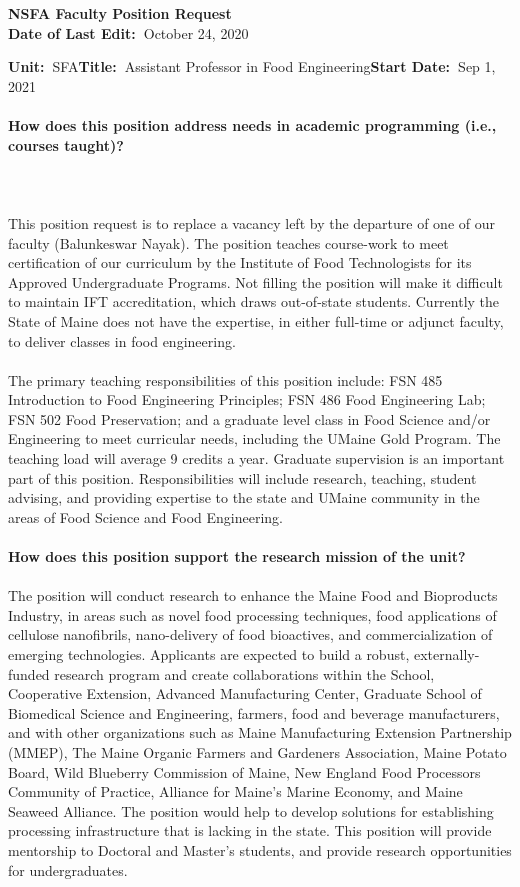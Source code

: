 \documentclass[11pt]{article}
\begin{document}
\sloppy \rmfamily
\begin{center}\textbf{NSFA Faculty Position Request\\Date of Last Edit:~}October 24, 2020\end{center}

\noindent\textbf{Unit:~}SFA\hfill\textbf{Title:~}Assistant Professor in Food Engineering\hfill \textbf{Start Date:~}Sep 1, 2021\\~\\
\textbf{How does this position address needs in academic programming (i.e., courses taught)?}\\~\\
\small\sffamily 
\\~\\
This position request is to replace a vacancy left by the departure of one of our faculty (Balunkeswar Nayak).  The position teaches course-work to meet certification of our curriculum by the Institute of Food Technologists for its Approved Undergraduate Programs. Not filling the position will make it difficult to maintain IFT accreditation, which draws out-of-state students. Currently the State of Maine does not have the expertise, in either full-time or adjunct faculty, to deliver classes in food engineering.
\\~\\
The primary teaching responsibilities of this position include: FSN 485 Introduction to Food Engineering Principles; FSN 486 Food Engineering Lab; FSN 502 Food Preservation; and a graduate level class in Food Science and/or Engineering to meet curricular needs, including the UMaine Gold Program. The teaching load will average 9 credits a year. Graduate supervision is an important part of this position. Responsibilities will include research, teaching, student advising, and providing expertise to the state and UMaine community in the areas of Food Science and Food Engineering.
\\~\\
\textbf{\rmfamily How does this position support the research mission of the unit?}\\~\\
The position will conduct research to enhance the Maine Food and Bioproducts Industry, in areas such as novel food processing techniques, food applications of cellulose nanofibrils, nano-delivery of food bioactives, and commercialization of emerging technologies. Applicants are expected to build a robust, externally-funded research program and create collaborations within the School, Cooperative Extension, Advanced Manufacturing Center, Graduate School of Biomedical Science and Engineering, farmers, food and beverage manufacturers, and with other organizations such as Maine Manufacturing Extension Partnership (MMEP), The Maine Organic Farmers and Gardeners Association, Maine Potato Board, Wild Blueberry Commission of Maine, New England Food Processors Community of Practice, Alliance for Maine's Marine Economy, and Maine Seaweed Alliance. The position would help to develop solutions for establishing processing infrastructure that is lacking in the state. This position will provide mentorship to Doctoral and Master’s students, and provide research opportunities for undergraduates.
\end{document}

